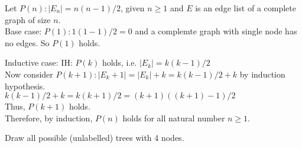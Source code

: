 \documentclass[solutionorbox,answers]{exam}
\begin{document}
\begin{questions}
\begin{solutionbox}{3.8in}

  Let $P(n) : |E_n| =n(n-1)/2$, given $n \geq 1$ and $E$ is an edge list of a complete graph of size $n$.\\

  Base case: $P(1) : 1(1-1)/2 = 0$ and a complemte graph with single node has no edges. So $P(1)$ holds.

  Inductive case:
  IH: $P(k)$ holds, i.e. $|E_k|=k(k-1)/2$\\

  Now consider $P(k+1) : |E_k+1| = |E_k|+k = k(k-1)/2+k$ by induction hypothesis.\\
  $k(k-1)/2+k = k(k+1)/2 = (k+1)((k+1)-1)/2$\\
  Thus, $P(k+1)$ holds.\\

  Therefore, by induction, $P(n)$ holds for all natural number $n \geq 1$.

\end{solutionbox}

\question
Draw all possible (unlabelled) trees with 4 nodes.


\end{questions}
\end{document}
